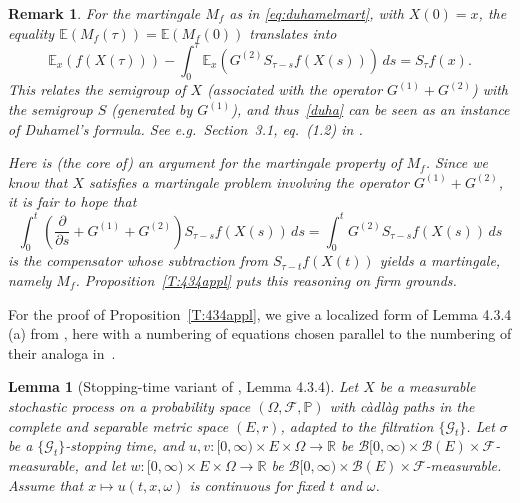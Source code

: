 \documentclass{imsart}
\theoremstyle{plain}
\newtheorem{lemma}[theorem]{Lemma}
\newtheorem{remark}[theorem]{Remark}
\theoremstyle{definition}
\begin{document}
\begin{appendix}
\begin{remark}\label{rem:duhamel} 
For the martingale $M_f$ as in \eqref{eq:duhamelmart}, with $X(0) =x$, the equality
  $\mathbb E(M_f(\tau)) = \mathbb E(M_f(0))$ translates into
  \begin{equation}\label{duha}
    \mathbb E_x(f(X(\tau))) - \int_0^\tau \mathbb E_x(G^{(2)} S_{\tau-s} f(X(s))) \, ds = S_\tau f(x).
 \end{equation}
This relates the semigroup of $X$ (associated with the operator $G^{(1)} + G^{(2)}$) with the semigroup $S$  (generated by $G^{(1)}$), and thus~\eqref{duha} can be seen as an instance of \emph{Duhamel's formula}. See e.g.\ Section~3.1, eq.~(1.2) in \cite{pazy}. 

Here is (the core of) an argument for the martingale property of $M_f$.
 Since we know that $X$ satisfies a martingale problem
involving the operator $G^{(1)} + G^{(2)}$, it is fair to hope that
$$\int_0^t \left( \frac{\partial}{\partial s} + G^{(1)} + G^{(2)} \right)
S_{\tau-s} f(X(s)) \, ds = \int_0^t G^{(2)} S_{\tau-s} f(X(s)) \, ds$$ 
is the compensator whose subtraction from $S_{\tau-t} f(X(t))$ yields a martingale, namely $M_f$. 
Proposition~\ref{T:434appl} puts this reasoning on firm grounds. 
  \end{remark}

\medskip

For the proof of Proposition~\ref{T:434appl}, we give a localized form of Lemma 4.3.4 (a) from \cite{EthierKurtz1986}, here with a numbering of equations chosen parallel to the numbering of their analoga in~\mbox{\cite[p. 176-177]{EthierKurtz1986}}.   

\begin{lemma}[Stopping-time variant of \cite{EthierKurtz1986}, Lemma 4.3.4]
\label{l:434}
Let $X$ be a measurable stochastic process on a probability space $(\Omega, \mathcal F, \mathbb P)$ with càdlàg paths in the complete and separable metric space $(E,r)$, adapted to the filtration $\{\mathcal G_t\}$. Let $\sigma$ be a $\{\mathcal G_t\}$-stopping time, and
$u, v : [0, \infty) \times E \times \Omega \to \mathbb R$ be $\mathcal B[0,\infty) \times \mathcal B(E) \times \mathcal F$-measurable, and let $w : [0, \infty) \times E \times \Omega \to \mathbb R$ be $\mathcal B[0,\infty) \times \mathcal B(E) \times \mathcal F$-measurable. Assume that $x\mapsto u(t, x, \omega)$ is continuous for fixed $t$ and $\omega$.


\end{lemma}
\end{appendix}
\end{document}
